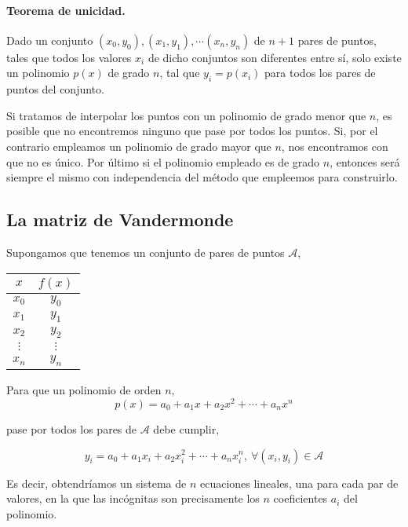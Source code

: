 \paragraph{Teorema de unicidad.} Dado un conjunto   $(x_0,y_0),(x_1,y_1),\cdots (x_n,y_n)$ de $n+1$ pares de puntos, tales que todos los valores $x_i$ de dicho conjuntos son diferentes entre sí, solo existe un polinomio $p(x)$ de grado $n$, tal que $y_i=p(x_i)$ para todos los pares de puntos del conjunto.

Si tratamos de interpolar los puntos con un polinomio de grado menor que $n$, es posible que no encontremos ninguno que pase por todos los puntos. Si, por el contrario empleamos un polinomio de grado mayor que $n$, nos encontramos con que no es único. Por último si el polinomio empleado es de grado $n$, entonces será siempre el mismo con independencia del método que empleemos para construirlo.

\subsection{La matriz de Vandermonde} 
Supongamos que tenemos un conjunto de pares de puntos $\mathcal{A}$, 
\begin{table}[h]
\centering
\begin{tabular}{c|c}
$x$&$f(x)$\\ 
\hline
$x_0$& $y_0$\\
$x_1$&$y_1$\\
$x_2$&$y_2$\\
$\vdots$&$\vdots$\\
$x_n$&$y_n$
\end{tabular}
\label{tpuntos3}
\end{table}

Para que un polinomio de orden $n$,
\begin{equation*}
p(x)=a_0+a_1x+a_2x^2+\cdots+a_nx^n
\end{equation*}

pase por todos los pares de $\mathcal{A}$ debe cumplir,

\begin{equation*}
y_i=a_0+a_1x_i+a_2x_i^2+\cdots+a_nx_i^n, \ \forall (x_i,y_i) \in \mathcal{A}
\end{equation*}

Es decir, obtendríamos un sistema de $n$ ecuaciones lineales, una para cada par de valores, en la que las incógnitas son precisamente los $n$ coeficientes $a_i$ del polinomio.

